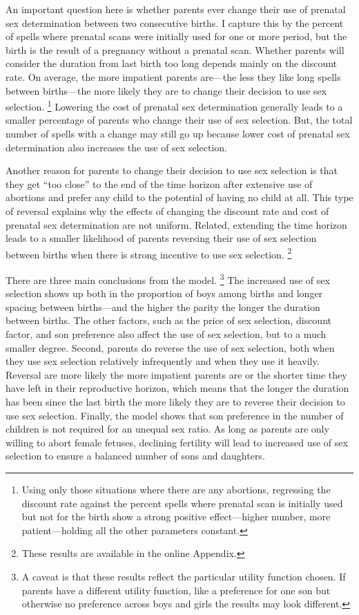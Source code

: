 \documentclass[12pt,letterpaper]{article}
\begin{document}
An important question here is whether parents ever
change their use of prenatal sex determination between
two consecutive births.
I capture this by the percent of spells where prenatal
scans were initially used for one or more period, but the birth
is the result of a pregnancy without a prenatal scan.
Whether parents will consider the duration from last birth too long 
depends mainly on the discount rate.
On average, the more impatient parents are---the less they
like long spells between births---the more likely they are to
change their decision to use sex selection.%
\footnote{
Using only those situations where there are any abortions,
regressing the discount rate against the percent spells where
prenatal scan is initially used but not for the birth show
a strong positive effect---higher number, more patient---holding
all the other parameters constant.
}
Lowering the cost of prenatal sex determination generally leads to 
a smaller percentage of parents who change their use of sex selection.
But, the total number of spells with a change may still
go up because lower cost of prenatal sex determination also
increases the use of sex selection.

Another reason for parents to change their decision to use sex
selection is that they get ``too close'' to the end of the time
horizon after extensive use of abortions and prefer any child to 
the potential of having no child at all.
This type of reversal explains why the effects of changing the discount 
rate and cost of prenatal sex determination are not uniform.
Related, extending the time horizon leads to a smaller likelihood of parents 
reversing their use of sex selection between births when
there is strong incentive to use sex selection.%
\footnote{
These results are available in the online Appendix.
}



There are three main conclusions from the model.%
\footnote{
A caveat is that these results reflect the particular utility 
function chosen.
If parents have a different utility function, like a preference
for one son but otherwise no preference across boys and girls
the results may look different.
}
The increased use of sex selection shows up both in the 
proportion of boys among births and longer spacing between 
births---and the higher the parity the longer the duration between 
births.
The other factors, such as the price of sex selection, 
discount factor, and son preference also affect the use
of sex selection, but to a much smaller degree.
Second, parents do reverse the use of sex selection, 
both when they use sex selection relatively infrequently and when 
they use it heavily.
Reversal are more likely the more impatient parents are or the
shorter time they have left in their reproductive horizon, which
means that the longer the duration has been since the last birth
the more likely they are to reverse their decision to use sex selection.
Finally, the model shows that son preference in the number of
children is not required for an unequal sex ratio.
As long as parents are only willing to abort female fetuses, declining
fertility will lead to increased use of sex selection to ensure 
a balanced number of sons and daughters.
\end{document}
